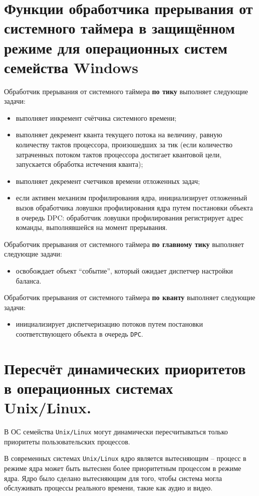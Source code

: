 \chapter{Функции обработчика прерывания от системного таймера в защищённом режиме для операционных систем семейства Windows}

Обработчик прерывания от системного таймера \textbf{по тику} выполняет следующие задачи:
\begin{itemize}
    \item выполняет инкремент счётчика системного времени;
    \item выполняет декремент кванта текущего потока на величину, равную количеству тактов процессора, произошедших за тик (если количество затраченных потоком тактов процессора достигает квантовой цели, запускается обработка истечения кванта);
    \item выполняет декремент счетчиков времени отложенных задач;
    \item если активен механизм профилирования ядра, инициализирует отложенный вызов обработчика ловушки профилирования ядра путем постановки объекта в очередь DPC: обработчик ловушки профилирования регистрирует адрес команды, выполнявшейся на момент прерывания.
\end{itemize}

Обработчик прерывания от системного таймера \textbf{по главному тику} выполняет следующие задачи:
\begin{itemize}
    \item освобождает объект ``событие'', который ожидает диспетчер настройки баланса.
\end{itemize}

Обработчик прерывания от системного таймера \textbf{по кванту} выполняет следующие задачи:
\begin{itemize}
    \item инициализирует диспетчеризацию потоков путем постановки соответствующего объекта в очередь \texttt{DPC}.
\end{itemize}


\chapter{Пересчёт динамических приоритетов в операционных системах Unix/Linux.}

В ОС семейства \texttt{Unix/Linux} могут динамически пересчитываться только приоритеты пользовательских процессов.

В современных системах \texttt{Unix/Linux} ядро является вытесняющим – процесс в режиме ядра может быть вытеснен более приоритетным процессом в режиме ядра. Ядро было сделано вытесняющим для того, чтобы система могла обслуживать процессы реального времени, такие как аудио и видео.

